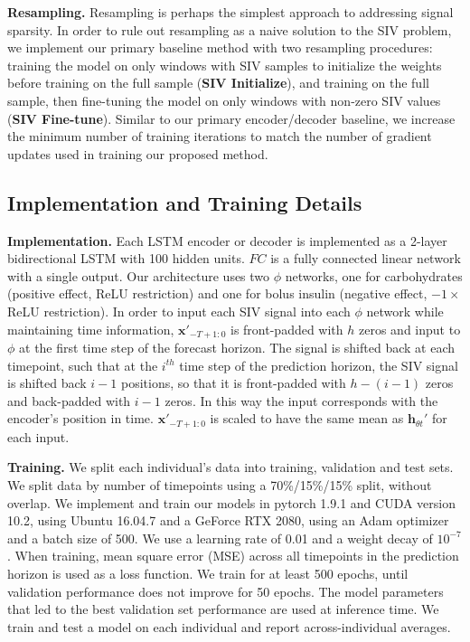 \documentclass[letterpaper]{article}
\begin{document}
\textbf{Resampling.} Resampling is perhaps the simplest approach to addressing signal sparsity. In order to rule out resampling as a naive solution to the SIV problem, we implement our primary baseline method with two resampling procedures: training the model on only windows with SIV samples to initialize the weights before training on the full sample (\textbf{SIV Initialize}), and training on the full sample, then fine-tuning the model on only windows with non-zero SIV values (\textbf{SIV Fine-tune}).  Similar to our primary encoder/decoder baseline, we increase the minimum number of training iterations to match the number of gradient updates used in training our proposed method.



\subsection{Implementation and Training Details}

\textbf{Implementation.} Each LSTM encoder or decoder is implemented as a 2-layer bidirectional LSTM with 100 hidden units. $FC$ is a fully connected linear network with a single output. Our architecture uses two $\phi$ networks, one for carbohydrates (positive effect, ReLU restriction) and one for bolus insulin (negative effect, $-1 \times $ ReLU restriction).  In order to input each SIV signal into each $\phi$ network while maintaining time information, $\mathbf{x}'_{-T+1:0}$ is front-padded with $h$ zeros and input to $\phi$ at the first time step of the forecast horizon. The signal is shifted back at each timepoint, such that at the $i^{th}$ time step of the prediction horizon, the SIV signal is shifted back $i-1$ positions, so that it is front-padded with $h-(i-1)$ zeros and back-padded with $i-1$ zeros. In this way the input corresponds with the encoder's position in time. $\mathbf{x}'_{-T+1:0}$ is scaled to have the same mean as $\mathbf{h}_{{\theta}t}'$ for each input.

\textbf{Training.} We split each individual's data into training, validation and test sets. We split data by number of timepoints using a 70\%/15\%/15\% split, without overlap. We implement and train our models in pytorch 1.9.1 and CUDA version 10.2, using Ubuntu 16.04.7 and a GeForce RTX 2080, using an Adam optimizer \cite{kn:adam} and a batch size of 500. We use a learning rate of 0.01 and a weight decay of $10^{-7}$. When training, mean square error (MSE) across all timepoints in the prediction horizon is used as a loss function. We train for at least 500 epochs, until validation performance does not improve for 50 epochs. The model parameters that led to the best validation set performance are used at inference time. We train and test a model on each individual and report across-individual averages.
 
\end{document}
